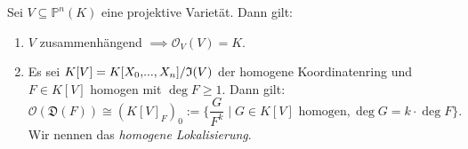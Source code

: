 \documentclass[a4paper,12pt,index=toc]{scrbook}
\theoremstyle{keinenummern} %
\def\I{\mathfrak{I}}
\def\O{\mathcal{O}}
\def\P{\mathbb{P}}
\newcommand{\D}{\mathfrak{D}}
\renewcommand{\dotsc}{\ensuremath{\!...}}
\newcommand{\ppolyx}[1][n]{\ensuremath%
  [X_{0},\dotsc,X_{#1}]}
\begin{document}
\begin{satz}\label{satz5}
Sei $V\subseteq\P^{n}(K)$ eine projektive Varietät. Dann gilt:
\begin{enumerate}
\item{} $V$ zusammenhängend $\implies\O_{V}(V)=K$.
\item{} Es sei $K[V]=\Quotient{K\ppolyx}{\I(V)}$ der homogene Koordinatenring und $F\in K[V]$ homogen mit $\deg F\geq 1$. Dann gilt:
\begin{equation*}\O(\D(F))\cong(K[V]_{F})_{0}:=\{\frac{G}{F^{k}}\mid G\in K[V]\text{ homogen}, \deg G = k\cdot\deg F\}.\end{equation*}
Wir nennen das \emph{homogene Lokalisierung}.
\end{enumerate}\end{satz}
\end{document}
